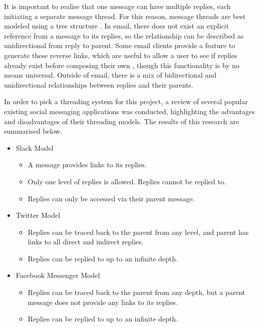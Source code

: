 It is important to realise that one message can have multiple replies, each initiating a separate message thread. For this reason, message threads are best modeled using a tree structure \cite{palme1998message}. In email, there does not exist an explicit reference from a message to its replies, so the relationship can be described as unidirectional from reply to parent. Some email clients provide a feature to generate these reverse links, which are useful to allow a user to see if replies already exist before composing their own \cite{palme1998message}, though this functionality is by no means universal. Outside of email, there is a mix of bidirectional and unidirectional relationships between replies and their parents.

In order to pick a threading system for this project, a review of several popular existing social messaging applications was conducted, highlighting the advantages and disadvantages of their threading models. The results of this research are summarised below.

\begin{itemize}
  \item Slack Model
    \begin{itemize}
      \item A message provides links to its replies.
      \item Only one level of replies is allowed. Replies cannot be replied to.
      \item Replies can only be accessed via their parent message.
    \end{itemize}
  \item Twitter Model
    \begin{itemize}
      \item Replies can be traced back to the parent from any level, and parent has links to all direct and indirect replies.
      \item Replies can be replied to up to an infinite depth.
    \end{itemize}
  \item Facebook Messenger Model
    \begin{itemize}
      \item Replies can be traced back to the parent from any depth, but a parent message does not provide any links to its replies.
      \item Replies can be replied to up to an infinite depth.
    \end{itemize}
\end{itemize}

